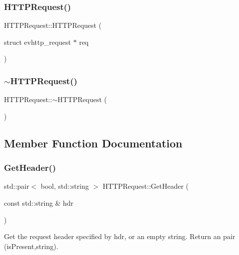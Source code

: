 \subsubsection{\texorpdfstring{H\+T\+T\+P\+Request()}{HTTPRequest()}}
{\footnotesize\ttfamily H\+T\+T\+P\+Request\+::\+H\+T\+T\+P\+Request (\begin{DoxyParamCaption}\item[{struct evhttp\+\_\+request $\ast$}]{req }\end{DoxyParamCaption})}

\mbox{\label{class_h_t_t_p_request_ab5864e916f43eddde9d2ccb69e0f1385}} 
\subsubsection{\texorpdfstring{$\sim$\+H\+T\+T\+P\+Request()}{~HTTPRequest()}}
{\footnotesize\ttfamily H\+T\+T\+P\+Request\+::$\sim$\+H\+T\+T\+P\+Request (\begin{DoxyParamCaption}{ }\end{DoxyParamCaption})}



\subsection{Member Function Documentation}
\mbox{\label{class_h_t_t_p_request_a7d31adee3f9e93edea6d9a5bd4454aae}} 
\subsubsection{\texorpdfstring{Get\+Header()}{GetHeader()}}
{\footnotesize\ttfamily std\+::pair$<$ bool, std\+::string $>$ H\+T\+T\+P\+Request\+::\+Get\+Header (\begin{DoxyParamCaption}\item[{const std\+::string \&}]{hdr }\end{DoxyParamCaption})}

Get the request header specified by hdr, or an empty string. Return an pair (is\+Present,string). \mbox{\label{class_h_t_t_p_request_a73ba24bc6528fd1aa5024c10330bfdfb}} 
